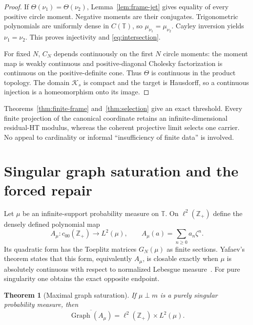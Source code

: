 \documentclass[11pt]{article}
\newtheorem{theorem}{Theorem}[section]
\newcommand{\T}{\mathbb T}
\newcommand{\cK}{\mathcal K}
\newcommand{\Graph}{\operatorname{Graph}}
\begin{document}
\begin{proof}
If $\Theta(\nu_1)=\Theta(\nu_2)$, Lemma~\ref{lem:frame-jet} gives equality of every positive
circle moment.  Negative moments are their conjugates.  Trigonometric polynomials are uniformly
dense in $C(\T)$, so $\mu_{\nu_1}=\mu_{\nu_2}$.  Cayley inversion yields
$\nu_1=\nu_2$.  This proves injectivity and \eqref{eq:intersection}.

For fixed $N$, $C_N$ depends continuously on the first $N$ circle moments: the moment map is weakly
continuous and positive-diagonal Cholesky factorization is continuous on the positive-definite
cone.  Thus $\Theta$ is continuous in the product topology.  The domain $\cK_s$ is compact and
the target is Hausdorff, so a continuous injection is a homeomorphism onto its image.
\end{proof}

Theorems~\ref{thm:finite-frame} and~\ref{thm:selection} give an exact threshold.  Every finite
projection of the canonical coordinate retains an infinite-dimensional residual-HT modulus,
whereas the coherent projective limit selects one carrier.  No appeal to cardinality or informal
``insufficiency of finite data'' is involved.

\section{Singular graph saturation and the forced repair}\label{sec:graph}

Let $\mu$ be an infinite-support probability measure on $\T$.  On
$\ell^2(\mathbb Z_+)$ define the densely defined polynomial map
\begin{equation}\label{eq:raw-map}
  A_\mu:c_{00}(\mathbb Z_+)\longrightarrow L^2(\mu),
  \qquad A_\mu(a)=\sum_{n\geq0}a_n\zeta^n.
\end{equation}
Its quadratic form has the Toeplitz matrices $G_N(\mu)$ as finite sections.  Yafaev's theorem
states that this form, equivalently $A_\mu$, is closable exactly when
$\mu$ is absolutely continuous with respect to normalized Lebesgue measure~\cite{Yafaev2016}.
For pure singularity one obtains the exact opposite endpoint.

\begin{theorem}[Maximal graph saturation]\label{thm:saturation}
If $\mu\perp m$ is a purely singular probability measure, then
\begin{equation}\label{eq:saturation}
  \overline{\Graph(A_\mu)}
  =\ell^2(\mathbb Z_+)\times L^2(\mu).
\end{equation}
\end{theorem}
\end{document}
